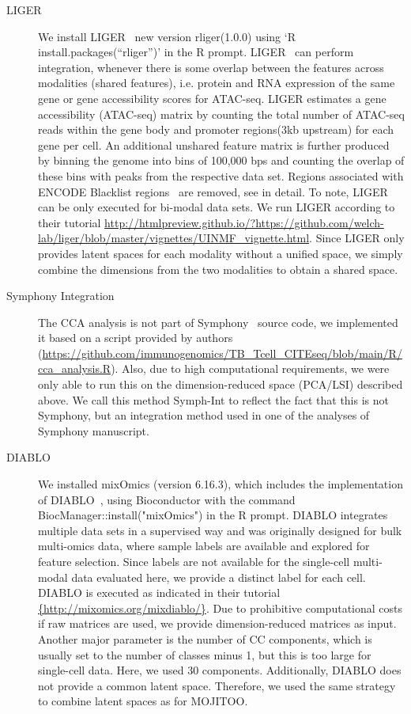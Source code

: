 \begin{description}
    \item[LIGER]
    We install LIGER~\citep{kriebel2021nonnegative} new version rliger(1.0.0) using `R install.packages(``rliger'')' in the R prompt. LIGER~\citep{kriebel2021nonnegative} can perform integration, whenever there is some overlap between the features across modalities (shared features), i.e. protein and RNA expression of the same gene or gene accessibility scores for ATAC-seq. LIGER estimates a gene accessibility (ATAC-seq) matrix by counting the total number of ATAC-seq reads within the gene body and promoter regions(3kb upstream) for each gene per cell. An additional unshared feature matrix is further produced by binning the genome into bins of 100,000 bps and counting the overlap of these bins with peaks from the respective data set. Regions associated with ENCODE Blacklist regions~\citep{amemiya2019encode} are removed, see in detail\citep{liu2020jointly}. To note, LIGER can be only executed for bi-modal data sets. We run LIGER according to their tutorial \url{http://htmlpreview.github.io/?https://github.com/welch-lab/liger/blob/master/vignettes/UINMF_vignette.html}. Since LIGER only provides latent spaces for each modality without a unified space, we simply combine the dimensions from the two modalities to obtain a shared space.
    
    \item[Symphony Integration]
    The CCA analysis is not part of Symphony~\cite{kang2021symphony} source code, we implemented it based on a script provided by authors (\url{https://github.com/immunogenomics/TB_Tcell_CITEseq/blob/main/R/cca_analysis.R}). Also, due to high computational requirements, we were only able to run this on the dimension-reduced space (PCA/LSI) described above. We call this method Symph-Int to reflect the fact that this is not Symphony, but an integration method used in one of the analyses of Symphony manuscript. 
    
    \item[DIABLO]
    We installed mixOmics (version 6.16.3), which includes the implementation of DIABLO~\cite{singh2019diablo}, using Bioconductor with the command BiocManager::install("mixOmics") in the R prompt. DIABLO integrates multiple data sets in a supervised way and was originally designed for bulk multi-omics data, where sample labels are available and explored for feature selection. Since labels are not available for the single-cell multi-modal data evaluated here, we provide a distinct label for each cell. DIABLO is executed as indicated in their tutorial \url{{http://mixomics.org/mixdiablo/}}. Due to prohibitive computational costs if raw matrices are used, we provide dimension-reduced matrices as input. Another major parameter is the number of CC components, which is usually set to the number of classes minus 1, but this is too large for single-cell data. Here, we used 30 components. Additionally, DIABLO does not provide a common latent space. Therefore, we used the same strategy to combine latent spaces as for MOJITOO.
\end{description}


